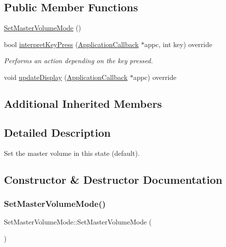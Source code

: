 \subsection*{Public Member Functions}
\begin{DoxyCompactItemize}
\item 
\hyperlink{classdrumpi_1_1SetMasterVolumeMode_a0b8ba5fbd8da846136ffcde88364fc94}{Set\+Master\+Volume\+Mode} ()
\item 
bool \hyperlink{classdrumpi_1_1SetMasterVolumeMode_a18b5f4d0181ea1fbfd958afc473e240f}{interpret\+Key\+Press} (\hyperlink{classdrumpi_1_1ApplicationCallback}{Application\+Callback} $\ast$appc, int key) override
\begin{DoxyCompactList}\small\item\em Performs an action depending on the key pressed. \end{DoxyCompactList}\item 
void \hyperlink{classdrumpi_1_1SetMasterVolumeMode_ad8637f24eb5a7c11d829b8d41a9c46f2}{update\+Display} (\hyperlink{classdrumpi_1_1ApplicationCallback}{Application\+Callback} $\ast$appc) override
\end{DoxyCompactItemize}
\subsection*{Additional Inherited Members}


\subsection{Detailed Description}
Set the master volume in this state (default). 

\subsection{Constructor \& Destructor Documentation}
\mbox{\label{classdrumpi_1_1SetMasterVolumeMode_a0b8ba5fbd8da846136ffcde88364fc94}} 
\subsubsection{\texorpdfstring{Set\+Master\+Volume\+Mode()}{SetMasterVolumeMode()}}
{\footnotesize\ttfamily Set\+Master\+Volume\+Mode\+::\+Set\+Master\+Volume\+Mode (\begin{DoxyParamCaption}{ }\end{DoxyParamCaption})}

